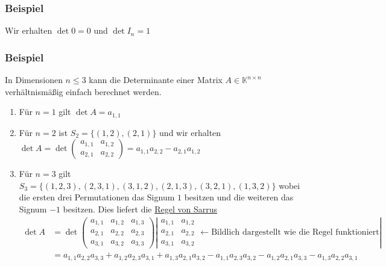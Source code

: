 \subsubsection{Beispiel}
Wir erhalten $\det0=0$ und $\det I_n=1$
\subsubsection{Beispiel}
In Dimensionen $n\leq 3$ kann die Determinante einer Matrix $A\in\mathbb{K}^{n\times n}$ verhältnismäßig einfach berechnet werden.
\begin{enumerate}
\item Für $n=1$ gilt $\det A=a_{1,1}$
\item Für $n=2$ ist $S_2=\{(1,2),(2,1)\}$ und wir erhalten $\det A=\det \begin{pmatrix}a_{1,1} & a_{1,2}\\ a_{2,1} & a_{2,2}\end{pmatrix}=a_{1,1}a_{2,2}-a_{2,1}a_{1,2}$
\item Für $n=3$ gilt $S_3=\{(1,2,3),(2,3,1),(3,1,2),(2,1,3),(3,2,1),(1,3,2)\}$ wobei die ersten drei Permutationen das Signum $1$ besitzen und die weiteren das Signum $-1$ besitzen.  Dies liefert die  \underline{Regel von Sarrus}
\begin{align*}
\det A&=\det \begin{pmatrix}a_{1,1} & a_{1,2} & a_{1,3}\\ a_{2,1} & a_{2,2} & a_{2,3}\\ a_{3,1} & a_{3,2} & a_{3,3}\end{pmatrix} \left|\begin{matrix}a_{1,1} & a_{1,2}\\ a_{2,1} & a_{2,2}\\ a_{3,1} & a_{3,2}\end{matrix} \leftarrow \text{Bildlich dargestellt wie die Regel funktioniert}\right|\\
&=a_{1,1}a_{2,2}a_{3,3}+a_{1,2}a_{2,3}a_{3,1}+a_{1,3}a_{2,1}a_{3,2}-a_{1,1}a_{2,3}a_{3,2}-a_{1,2}a_{2,1}a_{3,3}-a_{1,3}a_{2,2}a_{3,1}
\end{align*}
\end{enumerate}
